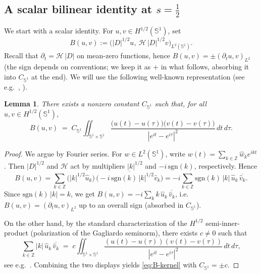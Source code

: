 \documentclass{amsart}
\newcounter{thm}
\newcounter{ex}
\newcounter{re}
\newtheorem{lemma}[thm]{Lemma}
\begin{document}
\subsection{A scalar bilinear identity at $s=\frac{1}{2}$}

We start with a scalar identity. For $u,v\in H^{1/2}(\mathbb S^1)$, set
\[
B(u,v):=\big(|D|^{1/2}u,\ \mathcal H\,|D|^{1/2}v\big)_{L^2(\mathbb S^1)}.
\]
Recall that $\partial_t = \mathcal H\,|D|$ on mean-zero functions, hence
$B(u,v)=\pm(\partial_t u,v)_{L^2}$ (the sign depends on conventions; we keep it
as $+$ in what follows, absorbing it into $C_{\mathbb S^1}$ at the end).
We will use the following well-known representation (see e.g.~\cite[§7]{DiNezzaPV}, \cite[Ch.~V]{SteinSI}).

\begin{lemma}\label{lem:scalar-kernel}
There exists a nonzero constant $C_{\mathbb S^1}$ such that, for all
$u,v\in H^{1/2}(\mathbb S^1)$,
\begin{equation}\label{eq:B-kernel}
B(u,v)
\;=\; C_{\mathbb S^1}
\iint_{\mathbb S^1\times\mathbb S^1}
\frac{\big(u(t)-u(\tau)\big)\big(v(t)-v(\tau)\big)}{|e^{it}-e^{i\tau}|^{2}}\,dt\,d\tau.
\end{equation}
\end{lemma}

\begin{proof}
We argue by Fourier series. For $w\in L^2(\mathbb S^1)$, write
$w(t)=\sum_{k\in\mathbb Z}\widehat w_k e^{ikt}$.
Then $|D|^{1/2}$ and $\mathcal H$ act by multipliers
$|k|^{1/2}$ and $-i\,\mathrm{sgn}(k)$, respectively. Hence
\[
B(u,v)=\sum_{k\in\mathbb Z}\big(|k|^{1/2}\widehat u_k\big)\,\overline{\big(-i\,\mathrm{sgn}(k)\,|k|^{1/2}\widehat v_k\big)}
= -i\sum_{k\in\mathbb Z}\mathrm{sgn}(k)\,|k|\,\widehat u_k\,\overline{\widehat v_k}.
\]
Since $\mathrm{sgn}(k)\,|k|=k$, we get $B(u,v)=-i\sum_{k}k\,\widehat u_k\,\overline{\widehat v_k}$, i.e.
$B(u,v)=(\partial_t u,v)_{L^2}$ up to an overall sign (absorbed in $C_{\mathbb S^1}$).

On the other hand, by the standard characterization of the $H^{1/2}$ semi-inner-product (polarization of the Gagliardo seminorm), there exists $c\neq 0$ such that
\[
\sum_{k\in\mathbb Z}|k|\,\widehat u_k\,\overline{\widehat v_k}
\;=\; c\iint_{\mathbb S^1\times\mathbb S^1}
\frac{(u(t)-u(\tau))(v(t)-v(\tau))}{|e^{it}-e^{i\tau}|^{2}}\,dt\,d\tau,
\]
see e.g.~\cite[Prop.~3.3, Prop.~3.6]{DiNezzaPV}. Combining the two displays yields
\eqref{eq:B-kernel} with $C_{\mathbb S^1}=\pm c$.
\end{proof}
\end{document}

